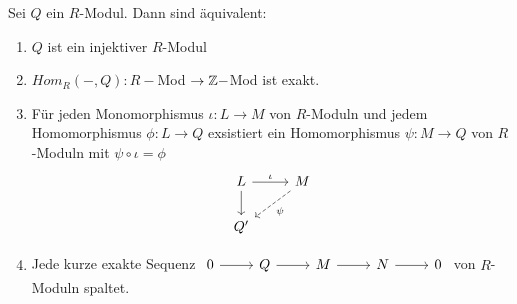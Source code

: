 \begin{sa}\label{6.7}
	Sei $Q$ ein $R$-Modul. Dann sind äquivalent:
	\begin{enumerate} [label= \roman*)]
		\item $Q$ ist ein injektiver $R$-Modul 
		\item $Hom_{R}(-,Q): R-$Mod $\to \mathbb{Z}-$Mod ist exakt.
		\item Für jeden Monomorphismus $\iota: L \to M $ von $R$-Moduln und jedem Homomorphismus $\phi: L \to Q $ exsistiert ein Homomorphismus $\psi: M \to Q $ von $R$-Moduln  mit $ \psi \circ \iota = \phi $
		$$\begin{tikzcd}
		L \arrow{r} {\iota} \arrow{d}& M \arrow[dashed]{dl}{\psi} \\
		Q' &
		\end{tikzcd}
		$$
		\item Jede kurze exakte Sequenz $\begin{tikzcd}
		0  \arrow{r} & Q \arrow{r} & M \arrow{r} & N \arrow{r} & 0
		\end{tikzcd} $ von $R$-Moduln spaltet.
	\end{enumerate}
\end{sa}
